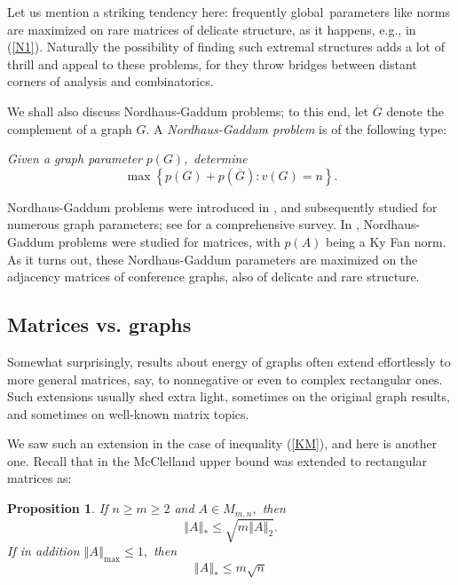 \documentclass[12pt]{article}%
\newtheorem{proposition}[theorem]{Proposition}
\begin{document}
Let us mention a striking tendency here: frequently global\ parameters like
norms are maximized on rare matrices of delicate structure, as it happens,
e.g., in (\ref{N1}). Naturally the possibility of finding such extremal
structures adds a lot of thrill and appeal to these problems, for they throw
bridges between distant corners of analysis and combinatorics.\medskip

We shall also discuss Nordhaus-Gaddum problems; to this end, let $\overline
{G}$ denote the complement of a graph $G.$ A \emph{Nordhaus-Gaddum problem} is
of the following type:\medskip

\emph{Given a graph parameter }$p\left(  G\right)  ,$\emph{ determine}
\[
\max\left\{  p\left(  G\right)  +p(\overline{G}):v\left(  G\right)
=n\right\}  .
\]


Nordhaus-Gaddum problems were introduced in \cite{NoGa56}, and subsequently
studied for numerous graph parameters; see \cite{AoHa13} for a comprehensive
survey. In \cite{NiYu13}, Nordhaus-Gaddum problems were studied for matrices,
with $p\left(  A\right)  $ being a Ky Fan norm. As it turns out, these
Nordhaus-Gaddum parameters are maximized on the adjacency matrices of
conference graphs, also of delicate and rare structure.

\subsection{Matrices vs. graphs}

Somewhat surprisingly, results about energy of graphs often extend
effortlessly to more general matrices, say, to nonnegative or even to complex
rectangular ones. Such extensions usually shed extra light, sometimes on the
original graph results, and sometimes on well-known matrix topics.

We saw such an extension in the case of inequality (\ref{KM}), and here is
another one. Recall that in \cite{Nik12} the McClelland upper bound
\cite{McL71} was extended to rectangular matrices as:

\begin{proposition}
\label{pro}If $n\geq m\geq2$ and $A\in M_{m,n},$ then
\begin{equation}
\left\Vert A\right\Vert _{\ast}\leq\sqrt{m\left\Vert A\right\Vert _{2}}.
\label{hin0}%
\end{equation}
If in addition $\left\Vert A\right\Vert _{\max}\leq1,$ then%
\begin{equation}
\left\Vert A\right\Vert _{\ast}\leq m\sqrt{n} \label{hin}%
\end{equation}

\end{proposition}
\end{document}
